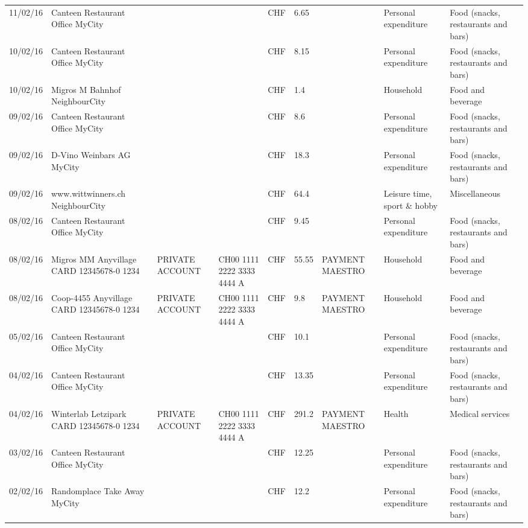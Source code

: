 \begin{landscape}
\begin{table}[t]
\begin{center}
\begin{tabular}{lllllllll}
		11/02/16 & Canteen Restaurant Office      MyCity &       &       & CHF   & 6.65  &       & Personal expenditure & Food (snacks, restaurants and bars) \\
		10/02/16 & Canteen Restaurant Office      MyCity &       &       & CHF   & 8.15  &       & Personal expenditure & Food (snacks, restaurants and bars) \\
		10/02/16 & Migros M Bahnhof         NeighbourCity &       &       & CHF   & 1.4   &       & Household & Food and beverage \\
		09/02/16 & Canteen Restaurant Office      MyCity &       &       & CHF   & 8.6   &       & Personal expenditure & Food (snacks, restaurants and bars) \\
		09/02/16 & D-Vino Weinbars AG       MyCity &       &       & CHF   & 18.3  &       & Personal expenditure & Food (snacks, restaurants and bars) \\
		09/02/16 & www.wittwinners.ch        NeighbourCity &       &       & CHF   & 64.4  &       & Leisure time, sport \& hobby & Miscellaneous \\
		08/02/16 & Canteen Restaurant Office      MyCity &       &       & CHF   & 9.45  &       & Personal expenditure & Food (snacks, restaurants and bars) \\
		08/02/16 & Migros MM Anyvillage CARD 12345678-0 1234 & PRIVATE ACCOUNT & CH00 1111 2222 3333 4444 A & CHF   & 55.55 & PAYMENT MAESTRO & Household & Food and beverage \\
		08/02/16 & Coop-4455 Anyvillage CARD 12345678-0 1234 & PRIVATE ACCOUNT & CH00 1111 2222 3333 4444 A & CHF   & 9.8   & PAYMENT MAESTRO & Household & Food and beverage \\
		05/02/16 & Canteen Restaurant Office      MyCity &       &       & CHF   & 10.1  &       & Personal expenditure & Food (snacks, restaurants and bars) \\
		04/02/16 & Canteen Restaurant Office      MyCity &       &       & CHF   & 13.35 &       & Personal expenditure & Food (snacks, restaurants and bars) \\
		04/02/16 & Winterlab Letzipark CARD 12345678-0 1234 & PRIVATE ACCOUNT & CH00 1111 2222 3333 4444 A & CHF   & 291.2 & PAYMENT MAESTRO & Health & Medical services  \\
		03/02/16 & Canteen Restaurant Office      MyCity &       &       & CHF   & 12.25 &       & Personal expenditure & Food (snacks, restaurants and bars) \\
		02/02/16 & Randomplace Take Away     MyCity &       &       & CHF   & 12.2  &       & Personal expenditure & Food (snacks, restaurants and bars) \\

\end{tabular}
\end{center}
\end{table}
\end{landscape}
